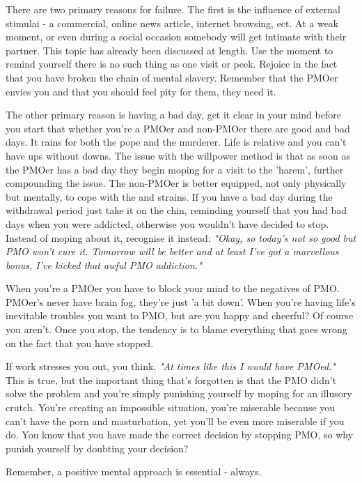 \documentclass[easypeasy.tex]{subfiles}
\begin{document}
There are two primary reasons for failure. The first is the influence of external stimulai - a commercial, online news article, internet browsing, ect. At a weak moment, or even during a social occasion somebody will get intimate with their partner. This topic has already been discussed at length. Use the moment to remind yourself there is no such thing as one visit or peek. Rejoice in the fact that you have broken the chain of mental slavery. Remember that the PMOer envies you and that you should feel pity for them, they need it.

The other primary reason is having a bad day, get it clear in your mind before you start that whether you're a PMOer and non-PMOer there are good and bad days. It rains for both the pope and the murderer. Life is relative and you can't have ups without downs. The issue with the willpower method is that as soon as the PMOer has a bad day they begin moping for a visit to the 'harem', further compounding the issue. The non-PMOer is better equipped, not only physically but mentally, to cope with the and strains. If you have a bad day during the withdrawal period just take it on the chin, reminding yourself that you had bad days when you were addicted, otherwise you wouldn't have decided to stop. Instead of moping about it, recognise it instead: \textit{"Okay, so today's not so good but PMO won't cure it. Tomorrow will be better and at least I've got a marvellous bonus, I've kicked that awful PMO addiction."}

When you're a PMOer you have to block your mind to the negatives of PMO. PMOer's never have brain fog, they're just 'a bit down'. When you're having life's inevitable troubles you want to PMO, but are you happy and cheerful? Of course you aren't. Once you stop, the tendency is to blame everything that goes wrong on the fact that you have stopped.

If work stresses you out, you think, \textit{"At times like this I would have PMOed."} This is true, but the important thing that's forgotten is that the PMO didn't solve the problem and you're simply punishing yourself by moping for an illusory crutch. You're creating an impossible situation, you're miserable because you can't have the porn and masturbation, yet you'll be even more miserable if you do. You know that you have made the correct decision by stopping PMO, so why punish yourself by doubting your decision?

{\Large Remember, a positive mental approach is essential - always.}
\end{document}
